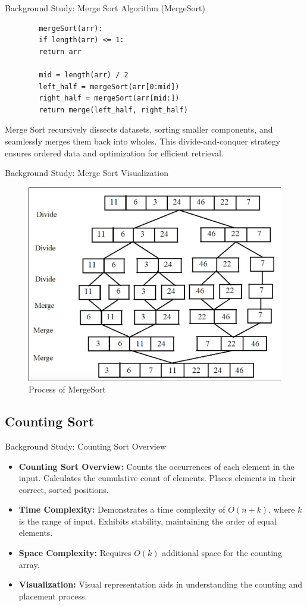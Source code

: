 \documentclass{beamer}
\begin{document}
\begin{frame}[fragile]{Background Study: Merge Sort Algorithm (MergeSort)}
	\begin{verbatim}
		mergeSort(arr):
		if length(arr) <= 1:
		return arr
		
		mid = length(arr) / 2
		left_half = mergeSort(arr[0:mid])
		right_half = mergeSort(arr[mid:])
		return merge(left_half, right_half)
	\end{verbatim}
	Merge Sort recursively dissects datasets, sorting smaller components, and seamlessly merges them back into wholes. This divide-and-conquer strategy ensures ordered data and optimization for efficient retrieval.
\end{frame}

\begin{frame}{Background Study: Merge Sort Visualization}
	\begin{figure}
		\centering
		\includegraphics[width=0.7\linewidth]{WhatsApp Image 2024-01-21 at 20.15.55_26ce695b.jpg}
		\caption{Process of MergeSort}
		\label{fig:enter-label}
	\end{figure}
\end{frame}

\subsection{Counting Sort}

\begin{frame}{Background Study: Counting Sort Overview}
	\begin{itemize}
		\item \textbf{Counting Sort Overview:} Counts the occurrences of each element in the input. Calculates the cumulative count of elements. Places elements in their correct, sorted positions.
		\item \textbf{Time Complexity:} Demonstrates a time complexity of $O(n + k)$, where $k$ is the range of input. Exhibits stability, maintaining the order of equal elements.
		\item \textbf{Space Complexity:} Requires $O(k)$ additional space for the counting array.
		\item \textbf{Visualization:} Visual representation aids in understanding the counting and placement process.
	\end{itemize}
\end{frame}
\end{document}
